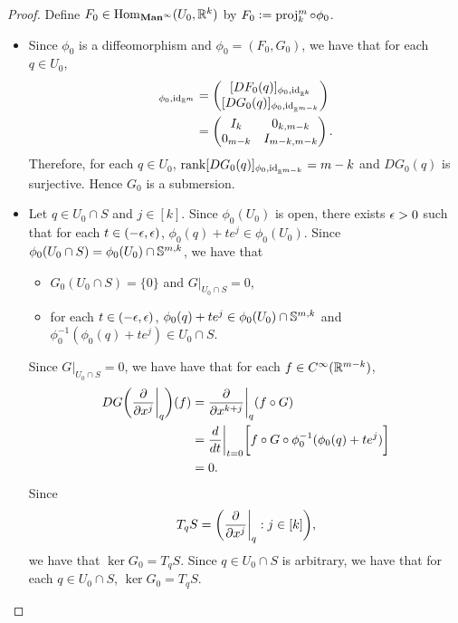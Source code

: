 \documentclass{book}
\begin{document}
	\begin{proof}
		Define $F_0 \in \Hom_{\Maninf}(U_0, \R^k)$ by $F_0 \defeq \prj^m_k \circ \phi_0$. 
		\begin{itemize}
			\item Since $\phi_0$ is a diffeomorphism and $\phi_0 = (F_0, G_0)$, we have that for each $q \in U_0$, 
			\begin{align*}
				[D\phi_0(q)]_{\phi_0, \id_{\R^m}} 
				& = 
				\begin{pmatrix}
					[DF_0(q)]_{\phi_0, \id_{\R^k}} \\
					[DG_0(q)]_{\phi_0, \id_{\R^{m-k}}}
				\end{pmatrix} \\
				& = 
				\begin{pmatrix}
					I_{k} & 0_{k, m - k} \\
					0_{m-k} & I_{m-k, m-k}
				\end{pmatrix}.
			\end{align*} 
			Therefore, for each $q \in U_0$, $\rnk [DG_0(q)]_{\phi_0, \id_{\R^{m-k}}} = m-k$ and $DG_0(q)$ is surjective. Hence $G_0$ is a submersion. 
			\item Let $q \in U_0 \cap S$ and $j \in [k]$. Since $\phi_0(U_0)$ is open, there exists $\ep >0$ such that for each $t \in (-\ep, \ep)$, $\phi_0(q) + t e^j \in \phi_0(U_0)$. Since $\phi_0(U_0 \cap S) = \phi_0(U_0) \cap \S^{m, k}$, we have that 
			\begin{itemize}
				\item $G_0(U_0 \cap S) = \{0\}$ and $G|_{U_0 \cap S} = 0$,
				\item for each $t \in (-\ep, \ep)$, $\phi_0(q) + t e^j \in \phi_0(U_0) \cap \S^{m,k}$ and $\phi_0^{-1}(\phi_0(q) + t e^j) \in U_0 \cap S$. 
			\end{itemize}
			Since $G|_{U_0 \cap S} = 0$, we have have that for each $f \in C^{\infty}(\R^{m-k})$,
			\begin{align*}
				DG \bigg( \frac{\p}{\p x^j} \bigg|_q \bigg)(f)
				& = \frac{\p}{\p x^{k+j}} \bigg|_q (f \circ G) \\
				& = \frac{d}{d t} \bigg|_{t = 0} \bigg[f \circ G \circ \phi_0^{-1}(\phi_0(q) + t e^j) \bigg] \\
				& = 0.
			\end{align*}
			Since 
			$$T_q S = \bigg(\frac{\p}{\p x^j} \bigg|_q : j \in [k] \bigg),$$
			we have that $\ker G_0 = T_q S$. Since $q \in U_0 \cap S$ is arbitrary, we have that for each $q \in U_0 \cap S$, $\ker G_0 = T_qS$.
		\end{itemize}
	\end{proof}
\end{document}
